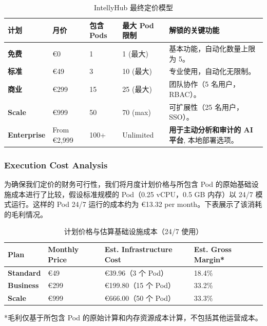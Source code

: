 \documentclass[11pt, a4paper, oneside]{article}
\begin{document}
\begin{table}[H]
\centering
\caption{IntellyHub 最终定价模型}
\label{tab:final_pricing_model}
\begin{tabularx}{\textwidth}{l L L L L} 
\toprule
\textbf{计划} & \textbf{月价} & \textbf{包含 Pods} & \textbf{最大 Pod 限制} & \textbf{解锁的关键功能} \\
\midrule
\textbf{免费} & \euro{0} & 1 & 1 (最大) & 基本功能，自动化数量上限为 5。 \\
\addlinespace
\textbf{标准} & \euro{49} & 3 & 10 (最大) & 专业使用，自动化无限制。 \\
\addlinespace
\textbf{商业} & \euro{299} & 15 & 25 (最大) & 团队协作（5 名用户，RBAC）。 \\
\addlinespace



\textbf{Scale} & \euro{999} & 50 & 70 (max) & 可扩展性（25 名用户，SSO）。 \\
\addlinespace
\textbf{Enterprise} & From \euro{2,999} & 100+ & Unlimited & \textbf{用于主动分析和审计的 AI 平台}, 本地部署选项。 \\
\bottomrule
\end{tabularx}
\end{table}

\subsubsection{Execution Cost Analysis}

为确保我们定价的财务可行性，我们将月度计划价格与所包含 Pod 的原始基础设施成本进行了比较，假设标准规模的 Pod（0.25 vCPU，0.5 GB 内存）以 24/7 模式运行。这样的 Pod 24/7 运行的成本约为 \euro{13.32 per month}。下表展示了该消耗的毛利情况。

\begin{table}[H]
\centering
\caption{计划价格与估算基础设施成本（24/7 使用）}
\label{tab:cost_analysis}
\begin{tabularx}{\textwidth}{L X X X} 
\toprule
\textbf{Plan} & \textbf{Monthly Price} & \textbf{Est. Infrastructure Cost} & \textbf{Est. Gross Margin*} \\
\midrule
\textbf{Standard} & \euro{49} & \euro{39.96}（3 个 Pod） & 18.4\% \\
\addlinespace
\textbf{Business} & \euro{299} & \euro{199.80}（15 个 Pod） & 33.2\% \\
\addlinespace
\textbf{Scale} & \euro{999} & \euro{666.00}（50 个 Pod） & 33.3\% \\
\bottomrule
\end{tabularx}
\raggedright
\footnotesize{*毛利仅基于所包含 Pod 的原始计算和内存资源成本计算，不包括其他运营成本。}
\end{table}
\end{document}
